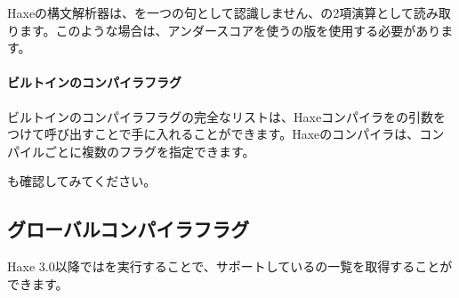 Haxeの構文解析器は、を一つの句として認識しません、の2項演算として読み取ります。このような場合は、アンダースコアを使うの版を使用する必要があります。

\paragraph{ビルトインのコンパイラフラグ}

ビルトインのコンパイラフラグの完全なリストは、Haxeコンパイラをの引数をつけて呼び出すことで手に入れることができます。Haxeのコンパイラは、コンパイルごとに複数のフラグを指定できます。

も確認してみてください。

\subsection{グローバルコンパイラフラグ}
\label{lf-condition-compilation-flags}

Haxe 3.0以降ではを実行することで、サポートしているの一覧を取得することができます。

